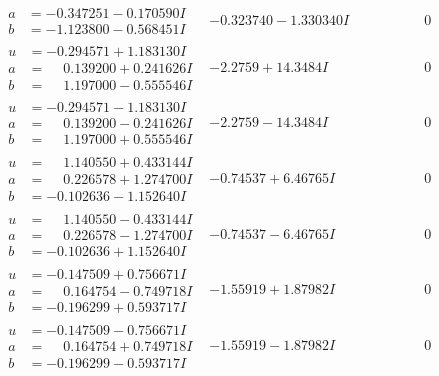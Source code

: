 \documentclass[1p]{elsarticle_modified}
\theoremstyle{definition}
\begin{document}
$$\begin{array}{c|c|c}
\begin{aligned}
a &= -0.347251 - 0.170590 I \\
b &= -1.123800 - 0.568451 I\end{aligned}
 & -0.323740 - 1.330340 I & \phantom{-0.000000 } 0 \\ \hline\begin{aligned}
u &= -0.294571 + 1.183130 I \\
a &= \phantom{-}0.139200 + 0.241626 I \\
b &= \phantom{-}1.197000 - 0.555546 I\end{aligned}
 & -2.2759 + 14.3484 I & \phantom{-0.000000 } 0 \\ \hline\begin{aligned}
u &= -0.294571 - 1.183130 I \\
a &= \phantom{-}0.139200 - 0.241626 I \\
b &= \phantom{-}1.197000 + 0.555546 I\end{aligned}
 & -2.2759 - 14.3484 I & \phantom{-0.000000 } 0 \\ \hline\begin{aligned}
u &= \phantom{-}1.140550 + 0.433144 I \\
a &= \phantom{-}0.226578 + 1.274700 I \\
b &= -0.102636 - 1.152640 I\end{aligned}
 & -0.74537 + 6.46765 I & \phantom{-0.000000 } 0 \\ \hline\begin{aligned}
u &= \phantom{-}1.140550 - 0.433144 I \\
a &= \phantom{-}0.226578 - 1.274700 I \\
b &= -0.102636 + 1.152640 I\end{aligned}
 & -0.74537 - 6.46765 I & \phantom{-0.000000 } 0 \\ \hline\begin{aligned}
u &= -0.147509 + 0.756671 I \\
a &= \phantom{-}0.164754 - 0.749718 I \\
b &= -0.196299 + 0.593717 I\end{aligned}
 & -1.55919 + 1.87982 I & \phantom{-0.000000 } 0 \\ \hline\begin{aligned}
u &= -0.147509 - 0.756671 I \\
a &= \phantom{-}0.164754 + 0.749718 I \\
b &= -0.196299 - 0.593717 I\end{aligned}
 & -1.55919 - 1.87982 I & \phantom{-0.000000 } 0 \\ \hline\begin{aligned}

\end{aligned}
\end{array}$$
\end{document}
